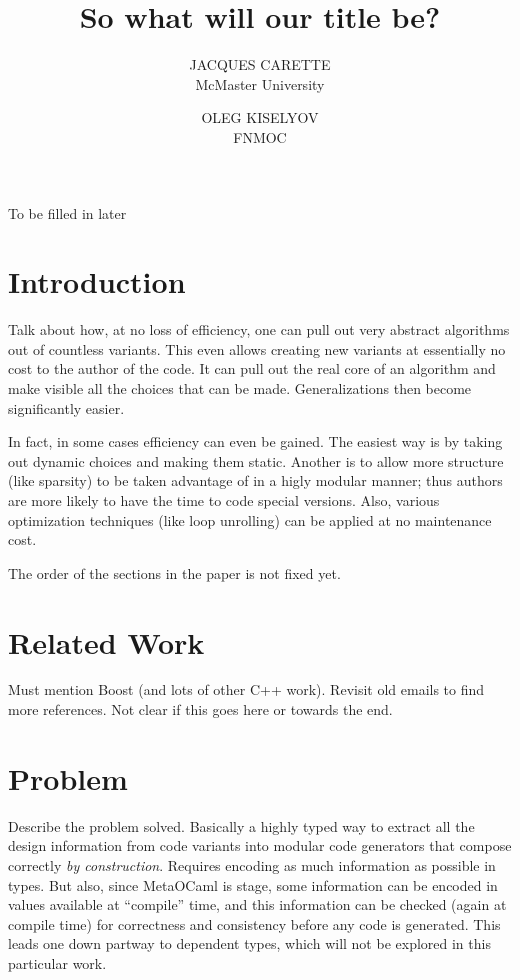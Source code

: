\documentclass[acmtoms]{acmtrans2m}
\title{So what will our title be?}
\author{JACQUES CARETTE\\ McMaster University
    \and OLEG KISELYOV\\ FNMOC}
\begin{document}
            
\begin{bottomstuff} 
To be filled in later
\end{bottomstuff}
            
\maketitle

\section{Introduction}

Talk about how, at no loss of efficiency, one can pull out very abstract
algorithms out of countless variants.  This even allows creating new
variants at essentially no cost to the author of the code.  It can pull
out the real core of an algorithm and make visible all the choices that
can be made.  Generalizations then become significantly easier.

In fact, in some cases efficiency can even be gained. 
The easiest way is by taking out dynamic choices and making them static.
Another is to allow more structure (like sparsity) to be taken advantage
of in a higly modular manner; thus authors are more likely to have the
time to code special versions.  Also, various optimization techniques
(like loop unrolling) can be applied at no maintenance cost.

The order of the sections in the paper is not fixed yet.

\section{Related Work}
Must mention Boost (and lots of other C++ work).  Revisit old emails to
find more references.  Not clear if this goes here or towards the end.

\section{Problem}
Describe the problem solved.  Basically a highly typed way to extract
all the design information from code variants into modular code generators
that compose correctly \emph{by construction}.  Requires encoding as
much information as possible in types.  But also, since MetaOCaml is
stage, some information can be encoded in values available at
``compile'' time, and this information can be checked (again at compile
time) for correctness and consistency before any code is generated.
This leads one down partway to dependent types, which will not be 
explored in this particular work.
\end{document}
